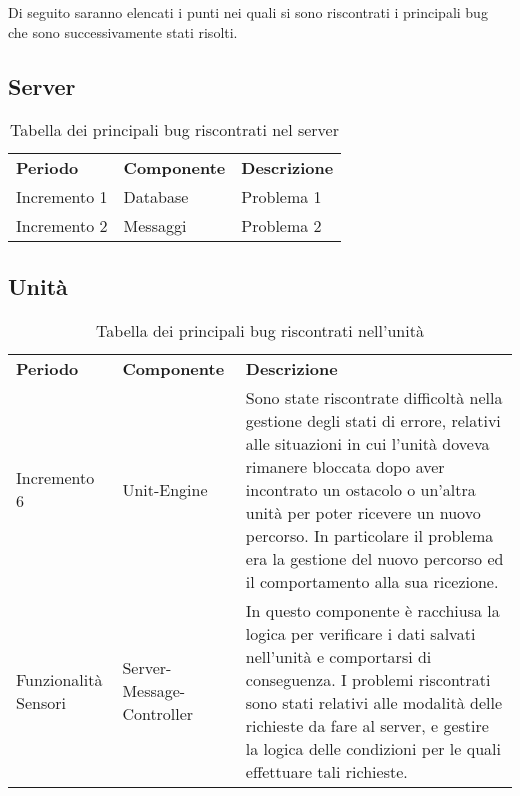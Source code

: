 Di seguito saranno elencati i punti nei quali si sono riscontrati i principali bug che sono successivamente stati risolti.

\subsection{Server}

\begin{table} [!ht]
	\begin{center}
		\begin{tabular} { m{2.5cm} m{2.5cm} m{11cm}  }
			\rowcolor{lightgray}
			\textbf{Periodo} & \textbf{Componente} & \textbf{Descrizione}\\
			
			Incremento 1 & Database & Problema 1 \\
			Incremento 2 & Messaggi & Problema 2 \\
								
		\end{tabular}
	\end{center}
	\caption{Tabella dei principali bug riscontrati nel server}
\end{table}

\subsection{Unità}

\begin{table} [!ht]
	\begin{center}
		\begin{tabular} { m{2.5cm} m{2.5cm} m{11cm}  }
			\rowcolor{lightgray}
			\textbf{Periodo} & \textbf{Componente} & \textbf{Descrizione}\\
			
			Incremento 6 & Unit-Engine & Sono state riscontrate difficoltà nella gestione degli stati di errore, relativi alle situazioni in cui l'unità doveva rimanere bloccata dopo aver incontrato un ostacolo o un'altra unità per poter ricevere un nuovo percorso. In particolare il problema era la gestione del nuovo percorso ed il comportamento alla sua ricezione. \\
			
			Funzionalità Sensori & Server-Message-Controller & In questo componente è racchiusa la logica per verificare i dati salvati nell'unità e comportarsi di conseguenza. I problemi riscontrati sono stati relativi alle modalità delle richieste da fare al server, e gestire la logica delle condizioni per le quali effettuare tali richieste. \\
			
		\end{tabular}
	\end{center}
	\caption{Tabella dei principali bug riscontrati nell'unità}
\end{table}

